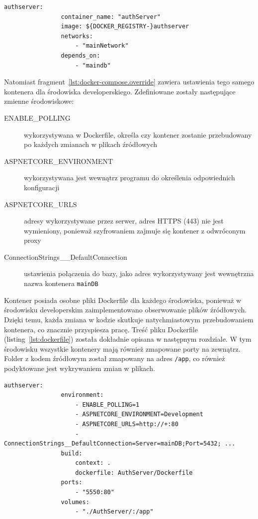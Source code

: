 		\begin{lstlisting}[label=lst:docker-compose,caption=Wspólne ustawienia kontenera authServer]
			authserver:
				container_name: "authServer"
				image: ${DOCKER_REGISTRY-}authserver
				networks:
					- "mainNetwork"
				depends_on:
					- "maindb"
		\end{lstlisting}

		Natomiast fragment~\ref{lst:docker-compose.override} zawiera ustawienia tego samego kontenera dla środowiska developerskiego.
		Zdefiniowane zostały następujące zmienne środowiskowe:
		\begin{description}
			\item[ENABLE\_POLLING] wykorzystywana w Dockerfile, określa czy kontener zostanie przebudowany po każdych zmianach w plikach źródłowych
			\item[ASPNETCORE\_ENVIRONMENT] wykorzystywana jest wewnątrz programu do określenia odpowiednich konfiguracji
			\item[ASPNETCORE\_URLS] adresy wykorzystywane przez serwer, adres HTTPS (443) nie jest wymieniony, ponieważ szyfrowaniem zajmuje się kontener z odwróconym proxy
			\item[ConnectionStrings\_\_DefaultConnection] ustawienia połączenia do bazy, jako adres wykorzystywany jest wewnętrzna nazwa kontenera \verb|mainDB|
		\end{description}
		Kontener posiada osobne pliki Dockerfile dla każdego środowiska, ponieważ w środowisku developerskim zaimplementowano obserwowanie plików źródłowych.
		Dzięki temu, każda zmiana w kodzie skutkuje natychmiastowym przebudowaniem kontenera, co znacznie przyspiesza pracę.
		Treść pliku Dockerfile (listing~\ref{lst:dockerfile}) została dokładnie opisana w następnym rozdziale.
		W tym środowisku wszystkie kontenery mają również zmapowane porty na zewnątrz.
		Folder z kodem źródłowym został zmapowany na adres \verb|/app|, co również podyktowane jest wykrywaniem zmian w plikach.

		\begin{lstlisting}[label=lst:docker-compose.override,caption=Ustawienia kontenera authServer dla środowiska developerskiego]
			authserver:
				environment:
					- ENABLE_POLLING=1
					- ASPNETCORE_ENVIRONMENT=Development
					- ASPNETCORE_URLS=http://+:80
					- ConnectionStrings__DefaultConnection=Server=mainDB;Port=5432; ...
				build:
					context: .
					dockerfile: AuthServer/Dockerfile
				ports:
					- "5550:80"
				volumes:
					- "./AuthServer/:/app"
		\end{lstlisting}

